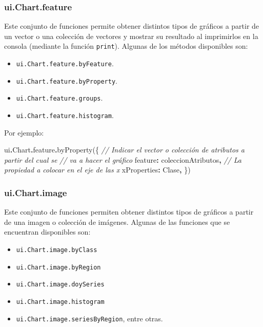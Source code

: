 \documentclass[
  12pt,
  letterpaper,
  twoside]{book}
\newenvironment{Shaded}{\begin{snugshade}}{\end{snugshade}}
\newcommand{\AttributeTok}[1]{\textcolor[rgb]{0.77,0.63,0.00}{#1}}
\newcommand{\CommentTok}[1]{\textcolor[rgb]{0.56,0.35,0.01}{\textit{#1}}}
\newcommand{\DataTypeTok}[1]{\textcolor[rgb]{0.13,0.29,0.53}{#1}}
\newcommand{\FunctionTok}[1]{\textcolor[rgb]{0.00,0.00,0.00}{#1}}
\newcommand{\NormalTok}[1]{#1}
\newcommand{\OperatorTok}[1]{\textcolor[rgb]{0.81,0.36,0.00}{\textbf{#1}}}
\newcommand{\StringTok}[1]{\textcolor[rgb]{0.31,0.60,0.02}{#1}}
\providecommand{\tightlist}{%
  \setlength{\itemsep}{0pt}\setlength{\parskip}{0pt}}
\begin{document}
\hypertarget{ui.chart.feature}{%
\subsubsection*{ui.Chart.feature}\label{ui.chart.feature}}

Este conjunto de funciones permite obtener distintos tipos de gráficos a partir de un vector o una colección de vectores y mostrar su resultado al imprimirlos en la consola (mediante la función \texttt{print}). Algunas de los métodos disponibles son:

\begin{itemize}
\tightlist
\item
  \texttt{ui.Chart.feature.byFeature}.
\item
  \texttt{ui.Chart.feature.byProperty}.
\item
  \texttt{ui.Chart.feature.groups}.
\item
  \texttt{ui.Chart.feature.histogram}.
\end{itemize}

Por ejemplo:

\begin{Shaded}
\begin{Highlighting}[]
\NormalTok{ui}\OperatorTok{.}\AttributeTok{Chart}\OperatorTok{.}\AttributeTok{feature}\OperatorTok{.}\FunctionTok{byProperty}\NormalTok{(\{}
  \CommentTok{// Indicar el vector o colección de atributos a partir del cual se }
  \CommentTok{// va a hacer el gráfico}
  \DataTypeTok{feature}\OperatorTok{:}\NormalTok{ coleccionAtributos}\OperatorTok{,} 
  \CommentTok{// La propiedad a colocar en el eje de las x}
  \DataTypeTok{xProperties}\OperatorTok{:} \StringTok{\textquotesingle{}Clase\textquotesingle{}}\OperatorTok{,}
\NormalTok{\})}
\end{Highlighting}
\end{Shaded}

\hypertarget{ui.chart.image}{%
\subsubsection*{ui.Chart.image}\label{ui.chart.image}}

Este conjunto de funciones permiten obtener distintos tipos de gráficos a partir de una imagen o colección de imágenes. Algunas de las funciones que se encuentran disponibles son:

\begin{itemize}
\tightlist
\item
  \texttt{ui.Chart.image.byClass}
\item
  \texttt{ui.Chart.image.byRegion}
\item
  \texttt{ui.Chart.image.doySeries}
\item
  \texttt{ui.Chart.image.histogram}
\item
  \texttt{ui.Chart.image.seriesByRegion}, entre otras.
\end{itemize}
\end{document}

